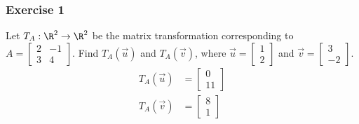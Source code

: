 \documentclass{math}
\begin{document}
\subsubsection*{Exercise 1}
Let \( T_A:\R^2\to\R^2 \) be the matrix transformation corresponding to
\( A = \begin{bmatrix}2 & -1 \\ 3 & 4\end{bmatrix} \). Find \( T_A(\vec{u}) \)
and \( T_A(\vec{v}) \), where \( \vec{u} = \begin{bmatrix}1 \\ 2\end{bmatrix} \)
and \( \vec{v} = \begin{bmatrix}3 \\ -2\end{bmatrix} \).
\begin{align*}
  T_A(\vec{u}) &= \begin{bmatrix}0 \\ 11\end{bmatrix} \\
  T_A(\vec{v}) &= \begin{bmatrix}8 \\ 1\end{bmatrix}
\end{align*}
\end{document}

